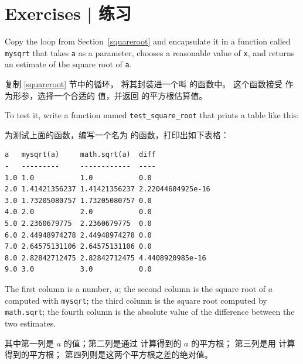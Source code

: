 \section{Exercises  |  练习}

\begin{exercise}

Copy the loop from Section~\ref{squareroot}
and encapsulate it in a function called
\verb"mysqrt" that takes {\tt a} as a parameter, chooses a
reasonable value of {\tt x}, and returns an estimate of the square
root of {\tt a}.  

复制 \ref{squareroot} 节中的循环， 将其封装进一个叫 {\em {}} 的函数中。 这个函数接受 {\em {}} 作为形参，选择一个合适的 {\em {}} 值，并返回 {\em {}} 的平方根估算值。

To test it, write a function named \verb"test_square_root"
that prints a table like this:

为测试上面的函数，编写一个名为 {\em {}} 的函数，打印出如下表格：

\begin{em}
\begin{lstlisting}
a   mysqrt(a)     math.sqrt(a)  diff
-   ---------     ------------  ----
1.0 1.0           1.0           0.0
2.0 1.41421356237 1.41421356237 2.22044604925e-16
3.0 1.73205080757 1.73205080757 0.0
4.0 2.0           2.0           0.0
5.0 2.2360679775  2.2360679775  0.0
6.0 2.44948974278 2.44948974278 0.0
7.0 2.64575131106 2.64575131106 0.0
8.0 2.82842712475 2.82842712475 4.4408920985e-16
9.0 3.0           3.0           0.0
\end{lstlisting}
\end{em}

%
The first column is a number, $a$; the second column is the square
root of $a$ computed with \verb"mysqrt"; the third column is the
square root computed by {\tt math.sqrt}; the fourth column is the
absolute value of the difference between the two estimates.

其中第一列是 $a$ 的值；第二列是通过 {\em {}} 计算得到的 $a$ 的平方根； 第三列是用 {\em {}} 计算得到的平方根； 第四列则是这两个平方根之差的绝对值。


\end{exercise}


